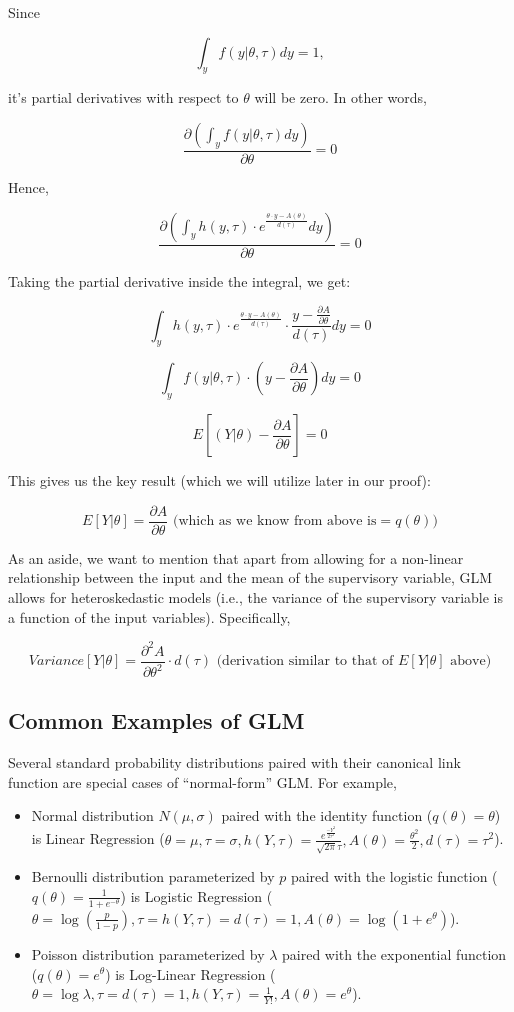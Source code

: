 \documentclass[10pt]{amsart}
\begin{document}
Since

$$\int_y f(y | \theta, \tau) dy = 1,$$

it's partial derivatives with respect to $\theta$ will be zero. In other words,

$$\frac {\partial (\int_y f(y | \theta, \tau) dy)} {\partial \theta} = 0$$

Hence,

$$\frac {\partial (\int_y  h(y, \tau) \cdot e^{\frac {\theta \cdot y - A(\theta)} {d(\tau)}} dy)} {\partial \theta} = 0$$

Taking the partial derivative inside the integral, we get:

$$\int_y  h(y, \tau) \cdot e^{\frac {\theta \cdot y - A(\theta)} {d(\tau)}} \cdot \frac {y - \frac {\partial A} {\partial \theta}} {d(\tau)} dy = 0$$

$$\int_y  f(y | \theta, \tau) \cdot (y - \frac {\partial A} {\partial \theta}) dy = 0$$

$$E[(Y|\theta) - \frac {\partial A} {\partial \theta}] = 0$$

This gives us the key result (which we will utilize later in our proof):

$$E[Y|\theta] = \frac {\partial A} {\partial \theta} \mbox{ (which as we know from above is} = q(\theta))$$

As an aside, we want to mention that apart from allowing for a non-linear relationship between the input and the mean of the supervisory variable, GLM allows for heteroskedastic models (i.e., the variance of the supervisory variable is a function of the input variables). Specifically,

$$Variance[Y|\theta] = \frac {\partial^2 A} {\partial \theta^2} \cdot d(\tau) \mbox{ (derivation similar to that of $E[Y|\theta]$ above)}$$

\subsection{Common Examples of GLM}
Several standard probability distributions paired with their canonical link function are special cases of ``normal-form'' GLM. For example,

\begin{itemize}
\item Normal distribution $N(\mu, \sigma)$ paired with the identity function ($q(\theta) = \theta$) is Linear Regression ($\theta = \mu, \tau = \sigma, h(Y, \tau) = \frac {e^{\frac {-Y^2} {2 \tau^2}}} {\sqrt{2 \pi} \tau}, A(\theta) = \frac {\theta^2} {2}, d(\tau) = \tau^2$).
\item Bernoulli distribution parameterized by $p$ paired with the logistic function ($q(\theta) = \frac {1} {1+ e^{-\theta}}$) is Logistic Regression ($\theta = \log{(\frac p {1-p})}, \tau = h(Y, \tau) = d(\tau) = 1, A(\theta) = \log{(1+e^{\theta})}$).
\item Poisson distribution parameterized by $\lambda$ paired with the exponential function ($q(\theta) = e^{\theta}$) is Log-Linear Regression ($\theta = \log{\lambda}, \tau = d(\tau) = 1, h(Y, \tau) = \frac 1 {Y!}, A(\theta) = e^{\theta}$).
\end{itemize}
\end{document}
